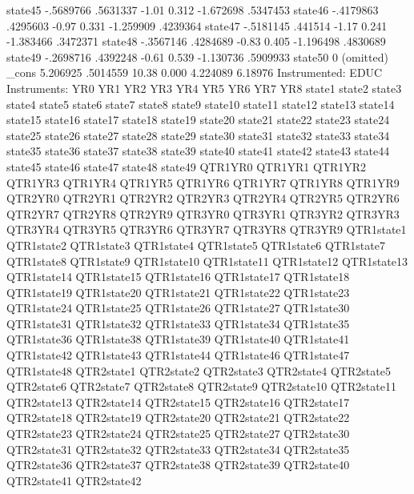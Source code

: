      state45 {\VBAR}  -.5689766   .5631337    -1.01   0.312    -1.672698    .5347453
     state46 {\VBAR}  -.4179863   .4295603    -0.97   0.331    -1.259909    .4239364
     state47 {\VBAR}  -.5181145    .441514    -1.17   0.241    -1.383466    .3472371
     state48 {\VBAR}  -.3567146   .4284689    -0.83   0.405    -1.196498    .4830689
     state49 {\VBAR}  -.2698716   .4392248    -0.61   0.539    -1.130736    .5909933
     state50 {\VBAR}          0  (omitted)
       _cons {\VBAR}   5.206925   .5014559    10.38   0.000     4.224089     6.18976
Instrumented:  EDUC
Instruments:   YR0 YR1 YR2 YR3 YR4 YR5 YR6 YR7 YR8 state1 state2 state3
               state4 state5 state6 state7 state8 state9 state10 state11
               state12 state13 state14 state15 state16 state17 state18
               state19 state20 state21 state22 state23 state24 state25
               state26 state27 state28 state29 state30 state31 state32
               state33 state34 state35 state36 state37 state38 state39
               state40 state41 state42 state43 state44 state45 state46
               state47 state48 state49 QTR1YR0 QTR1YR1 QTR1YR2 QTR1YR3
               QTR1YR4 QTR1YR5 QTR1YR6 QTR1YR7 QTR1YR8 QTR1YR9 QTR2YR0
               QTR2YR1 QTR2YR2 QTR2YR3 QTR2YR4 QTR2YR5 QTR2YR6 QTR2YR7
               QTR2YR8 QTR2YR9 QTR3YR0 QTR3YR1 QTR3YR2 QTR3YR3 QTR3YR4
               QTR3YR5 QTR3YR6 QTR3YR7 QTR3YR8 QTR3YR9 QTR1state1 QTR1state2
               QTR1state3 QTR1state4 QTR1state5 QTR1state6 QTR1state7
               QTR1state8 QTR1state9 QTR1state10 QTR1state11 QTR1state12
               QTR1state13 QTR1state14 QTR1state15 QTR1state16 QTR1state17
               QTR1state18 QTR1state19 QTR1state20 QTR1state21 QTR1state22
               QTR1state23 QTR1state24 QTR1state25 QTR1state26 QTR1state27
               QTR1state30 QTR1state31 QTR1state32 QTR1state33 QTR1state34
               QTR1state35 QTR1state36 QTR1state38 QTR1state39 QTR1state40
               QTR1state41 QTR1state42 QTR1state43 QTR1state44 QTR1state46
               QTR1state47 QTR1state48 QTR2state1 QTR2state2 QTR2state3
               QTR2state4 QTR2state5 QTR2state6 QTR2state7 QTR2state8
               QTR2state9 QTR2state10 QTR2state11 QTR2state13 QTR2state14
               QTR2state15 QTR2state16 QTR2state17 QTR2state18 QTR2state19
               QTR2state20 QTR2state21 QTR2state22 QTR2state23 QTR2state24
               QTR2state25 QTR2state27 QTR2state30 QTR2state31 QTR2state32
               QTR2state33 QTR2state34 QTR2state35 QTR2state36 QTR2state37
               QTR2state38 QTR2state39 QTR2state40 QTR2state41 QTR2state42
